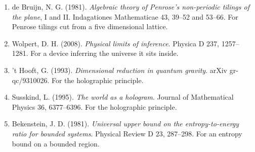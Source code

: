 \begin{enumerate}
  \item de Bruijn, N. G. (1981). \emph{Algebraic theory of Penrose's non-periodic tilings of the plane}, I and II. Indagationes Mathematicae 43, 39--52 and 53--66. For Penrose tilings cut from a five dimensional lattice.
  \item Wolpert, D. H. (2008). \emph{Physical limits of inference}. Physica D 237, 1257--1281. For a device inferring the universe it sits inside.
  \item 't Hooft, G. (1993). \emph{Dimensional reduction in quantum gravity}. arXiv gr-qc/9310026. For the holographic principle.
  \item Susskind, L. (1995). \emph{The world as a hologram}. Journal of Mathematical Physics 36, 6377--6396. For the holographic principle.
  \item Bekenstein, J. D. (1981). \emph{Universal upper bound on the entropy-to-energy ratio for bounded systems}. Physical Review D 23, 287--298. For an entropy bound on a bounded region.
\end{enumerate}
